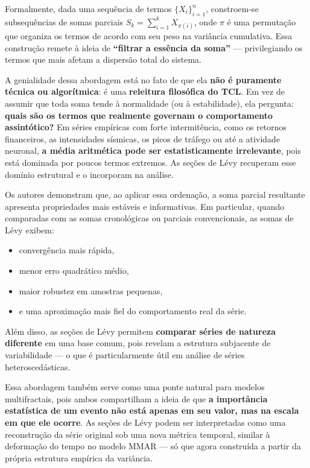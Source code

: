 \documentclass[
]{agujournal2019}
\providecommand{\tightlist}{%
  \setlength{\itemsep}{0pt}\setlength{\parskip}{0pt}}\usepackage{longtable,booktabs,array}
\begin{document}
Formalmente, dada uma sequência de termos \(\{X_i\}_{i=1}^n\),
constroem-se subsequências de somas parciais
\(S_k = \sum_{i=1}^k X_{\pi(i)}\), onde \(\pi\) é uma permutação que
organiza os termos de acordo com seu peso na variância cumulativa. Essa
construção remete à ideia de \textbf{``filtrar a essência da soma''} ---
privilegiando os termos que mais afetam a dispersão total do sistema.

A genialidade dessa abordagem está no fato de que ela \textbf{não é
puramente técnica ou algorítmica}: é uma \textbf{releitura filosófica do
TCL}. Em vez de assumir que toda soma tende à normalidade (ou à
estabilidade), ela pergunta: \textbf{quais são os termos que realmente
governam o comportamento assintótico?} Em séries empíricas com forte
intermitência, como os retornos financeiros, as intensidades sísmicas,
os picos de tráfego ou até a atividade neuronal, \textbf{a média
aritmética pode ser estatisticamente irrelevante}, pois está dominada
por poucos termos extremos. As seções de Lévy recuperam esse domínio
estrutural e o incorporam na análise.

Os autores demonstram que, ao aplicar essa ordenação, a soma parcial
resultante apresenta propriedades mais estáveis e informativas. Em
particular, quando comparadas com as somas cronológicas ou parciais
convencionais, as somas de Lévy exibem:

\begin{itemize}
\tightlist
\item
  convergência mais rápida,
\item
  menor erro quadrático médio,
\item
  maior robustez em amostras pequenas,
\item
  e uma aproximação mais fiel do comportamento real da série.
\end{itemize}

Além disso, as seções de Lévy permitem \textbf{comparar séries de
natureza diferente} em uma base comum, pois revelam a estrutura
subjacente de variabilidade --- o que é particularmente útil em análise
de séries heteroscedásticas.

Essa abordagem também serve como uma ponte natural para modelos
multifractais, pois ambos compartilham a ideia de que \textbf{a
importância estatística de um evento não está apenas em seu valor, mas
na escala em que ele ocorre}. As seções de Lévy podem ser interpretadas
como uma reconstrução da série original sob uma nova métrica temporal,
similar à deformação do tempo no modelo MMAR --- só que agora construída
a partir da própria estrutura empírica da variância.
\end{document}
